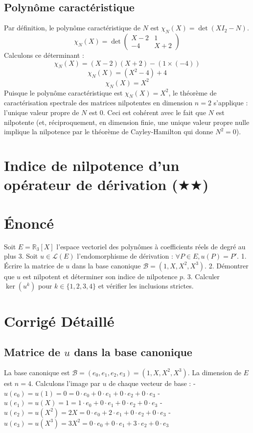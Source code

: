 \documentclass[11pt,a4paper]{article}
\begin{document}
\subsection{Polynôme caractéristique}
Par définition, le polynôme caractéristique de $N$ est $\chi_N(X) = \det(X I_2 - N)$.
$$\chi_N(X) = \det \begin{pmatrix} X - 2 & 1 \\ -4 & X + 2 \end{pmatrix}$$
Calculons ce déterminant :
$$\chi_N(X) = (X - 2)(X + 2) - (1 \times (-4))$$
$$\chi_N(X) = (X^2 - 4) + 4$$
$$\chi_N(X) = X^2$$
Puisque le polynôme caractéristique est $\chi_N(X) = X^2$, le théorème de caractérisation spectrale des matrices nilpotentes en dimension $n=2$ s'applique : l'unique valeur propre de $N$ est $0$. Ceci est cohérent avec le fait que $N$ est nilpotente (et, réciproquement, en dimension finie, une unique valeur propre nulle implique la nilpotence par le théorème de Cayley-Hamilton qui donne $N^2 = 0$).


\section{Indice de nilpotence d'un opérateur de dérivation ($\bigstar$$\bigstar$)}

\section{Énoncé}
Soit $E = \mathbb{R}_3[X]$ l'espace vectoriel des polynômes à coefficients réels de degré au plus 3.
Soit $u \in \mathcal{L}(E)$ l'endomorphisme de dérivation : $\forall P \in E, u(P) = P'$.
1. Écrire la matrice de $u$ dans la base canonique $\mathcal{B} = (1, X, X^2, X^3)$.
2. Démontrer que $u$ est nilpotent et déterminer son indice de nilpotence $p$.
3. Calculer $\ker(u^k)$ pour $k \in \{1, 2, 3, 4\}$ et vérifier les inclusions strictes.

\section{Corrigé Détaillé}

\subsection{Matrice de $u$ dans la base canonique}
La base canonique est $\mathcal{B} = (e_0, e_1, e_2, e_3) = (1, X, X^2, X^3)$. La dimension de $E$ est $n=4$.
Calculons l'image par $u$ de chaque vecteur de base :
- $u(e_0) = u(1) = 0 = 0 \cdot e_0 + 0 \cdot e_1 + 0 \cdot e_2 + 0 \cdot e_3$
- $u(e_1) = u(X) = 1 = 1 \cdot e_0 + 0 \cdot e_1 + 0 \cdot e_2 + 0 \cdot e_3$
- $u(e_2) = u(X^2) = 2X = 0 \cdot e_0 + 2 \cdot e_1 + 0 \cdot e_2 + 0 \cdot e_3$
- $u(e_3) = u(X^3) = 3X^2 = 0 \cdot e_0 + 0 \cdot e_1 + 3 \cdot e_2 + 0 \cdot e_3$
\end{document}
